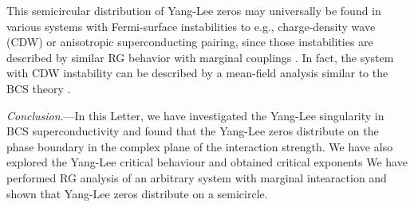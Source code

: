 \documentclass[aps,prl,twocolumn,nofootinbib,superscriptaddress,longbibliography]{revtex4-1}
\begin{document}
	This semicircular distribution of Yang-Lee zeros may universally be found in various systems with %
	 Fermi-surface instabilities to e.g., charge-density wave (CDW) or anisotropic superconducting pairing, since those instabilities are described by similar RG behavior with marginal couplings \cite{Shankar1994}. In fact, the system with CDW instability can be described by a mean-field analysis similar to the BCS theory \cite{Gersch2005,PhysRevB.103.045142,PhysRevB.72.195106}. %
	
	
	\emph{Conclusion}.---In this Letter, we have investigated the
	Yang-Lee singularity in BCS superconductivity
	and found that the Yang-Lee zeros distribute on the phase boundary in the complex plane of the interaction strength. We have also explored the Yang-Lee critical behaviour and obtained critical exponents %
	We have performed RG analysis of an arbitrary system with marginal intearaction and shown that Yang-Lee zeros distribute on a semicircle.
	
\end{document}
